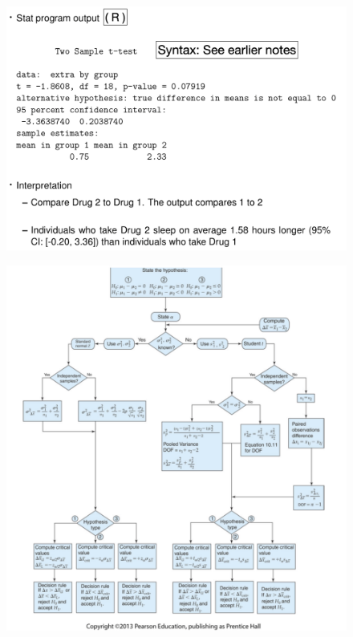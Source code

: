 \documentclass[14pt]{extarticle}
\begin{document}
\begin{figure}[H]
    \centering
    \includegraphics[width=1\textwidth]{fig21.png}
\end{figure}

\begin{figure}[H]
    \centering
    \includegraphics[width=1\textwidth]{fig22.png}
\end{figure}
\end{document}
